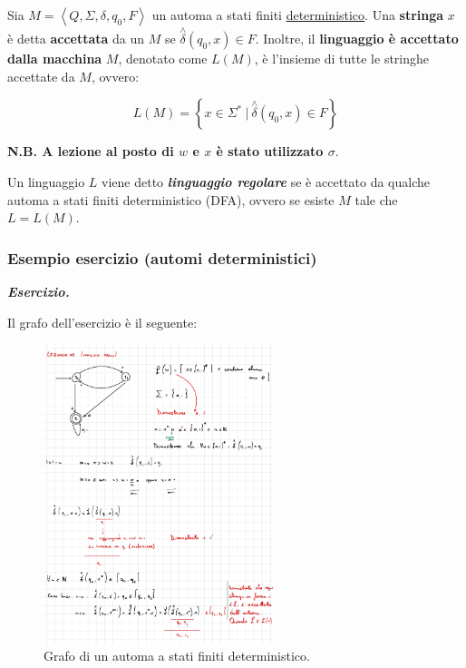 \documentclass[a4paper]{article}
\begin{document}
	Sia $M = \left\langle Q, \Sigma, \delta, q_0, F\right\rangle$ un automa a stati finiti \underline{deterministico}. Una \textbf{stringa} $x$ è detta \textbf{accettata} da un $M$ se $\overset{\wedge}{\delta}(q_{0}, x) \in F$. Inoltre, il \textbf{linguaggio è accettato dalla macchina} $M$, denotato come $L(M)$, è l'insieme di tutte le stringhe accettate da $M$, ovvero:
	
	\begin{equation*}
		L(M) = \left\{x \in \Sigma^{*} \: | \: \overset{\wedge}{\delta}(q_0, x) \in F\right\}
	\end{equation*}

	\noindent
	\textbf{N.B. A lezione al posto di $w$ e $x$ è stato utilizzato $\sigma.$}\newline
	
	\noindent
	Un linguaggio $L$ viene detto \textcolor{Red3}{\textbf{\emph{linguaggio regolare}}} se è accettato da qualche automa a stati finiti deterministico (DFA), ovvero se esiste $M$ tale che $L = L(M)$.
	
	\newpage
	
	\subsubsection{Esempio esercizio (automi deterministici)}
	
	\textcolor{Red3}{\textbf{\emph{Esercizio.}}}
	
	\noindent
	Il grafo dell'esercizio è il seguente:
	
	\begin{figure}[!htp]
		\centering
		\includegraphics[width=0.6\textwidth]{img/grafo_ex1.pdf}
		\caption{Grafo di un automa a stati finiti deterministico.}
	\end{figure}
	
\end{document}
